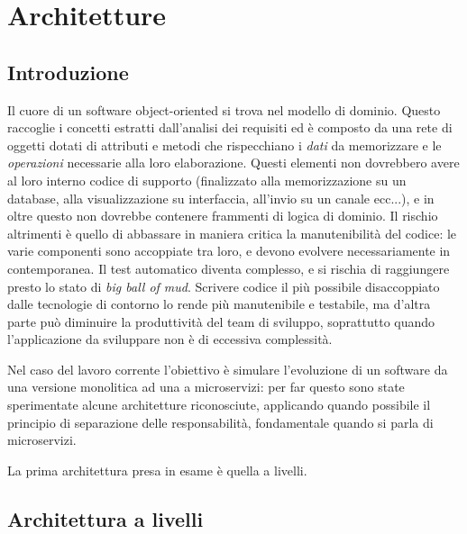 \chapter{Architetture}

\section{Introduzione}

Il cuore di un software object-oriented si trova nel modello di dominio. Questo raccoglie i concetti estratti dall'analisi dei requisiti ed è composto da una rete di oggetti dotati di attributi e metodi che rispecchiano i \textit{dati} da memorizzare e le \textit{operazioni} necessarie alla loro elaborazione.
Questi elementi non dovrebbero avere al loro interno codice di supporto (finalizzato alla memorizzazione su un database, alla visualizzazione su interfaccia, all'invio su un canale ecc...), e in oltre questo non dovrebbe contenere frammenti di logica di dominio.
Il rischio altrimenti è quello di abbassare in maniera critica la manutenibilità del codice: le varie componenti sono accoppiate tra loro, e devono evolvere necessariamente in contemporanea.
Il test automatico diventa complesso, e si rischia di raggiungere presto lo stato di \textit{big ball of mud}\cite{microservices_architecture}.
Scrivere codice il più possibile disaccoppiato dalle tecnologie di contorno lo rende più manutenibile e testabile, ma d'altra parte può diminuire la produttività del team di sviluppo, soprattutto quando l'applicazione da sviluppare non è di eccessiva complessità.

Nel caso del lavoro corrente l'obiettivo è simulare l'evoluzione di un software da una versione monolitica ad una a microservizi: per far questo sono state sperimentate alcune architetture riconosciute, applicando quando possibile il principio di separazione delle responsabilità, fondamentale quando si parla di microservizi.

La prima architettura presa in esame è quella a livelli.

\section{Architettura a livelli}

